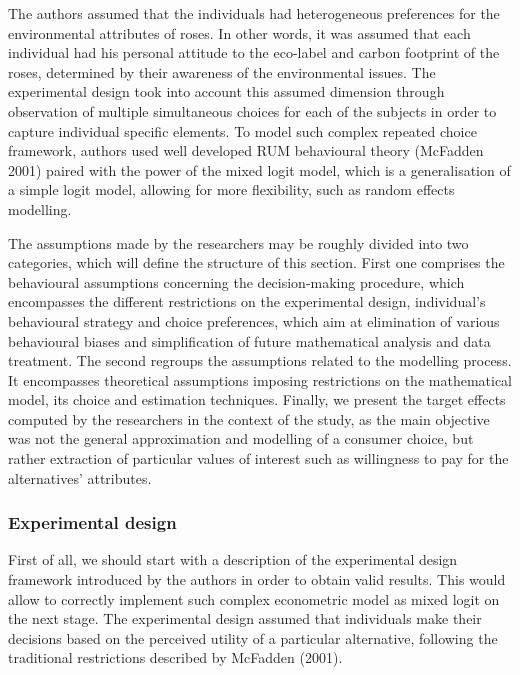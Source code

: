 \documentclass[11pt,]{article}
\begin{document}
The authors assumed that the individuals had heterogeneous preferences
for the environmental attributes of roses. In other words, it was
assumed that each individual had his personal attitude to the eco-label
and carbon footprint of the roses, determined by their awareness of the
environmental issues. The experimental design took into account this
assumed dimension through observation of multiple simultaneous choices
for each of the subjects in order to capture individual specific
elements. To model such complex repeated choice framework, authors used
well developed RUM behavioural theory (McFadden 2001) paired with the
power of the mixed logit model, which is a generalisation of a simple
logit model, allowing for more flexibility, such as random effects
modelling.

The assumptions made by the researchers may be roughly divided into two
categories, which will define the structure of this section. First one
comprises the behavioural assumptions concerning the decision-making
procedure, which encompasses the different restrictions on the
experimental design, individual's behavioural strategy and choice
preferences, which aim at elimination of various behavioural biases and
simplification of future mathematical analysis and data treatment. The
second regroups the assumptions related to the modelling process. It
encompasses theoretical assumptions imposing restrictions on the
mathematical model, its choice and estimation techniques. Finally, we
present the target effects computed by the researchers in the context of
the study, as the main objective was not the general approximation and
modelling of a consumer choice, but rather extraction of particular
values of interest such as willingness to pay for the alternatives'
attributes.

\hypertarget{experimental-design}{%
\subsubsection{Experimental design}\label{experimental-design}}

First of all, we should start with a description of the experimental
design framework introduced by the authors in order to obtain valid
results. This would allow to correctly implement such complex
econometric model as mixed logit on the next stage. The experimental
design assumed that individuals make their decisions based on the
perceived utility of a particular alternative, following the traditional
restrictions described by McFadden (2001).
\end{document}
